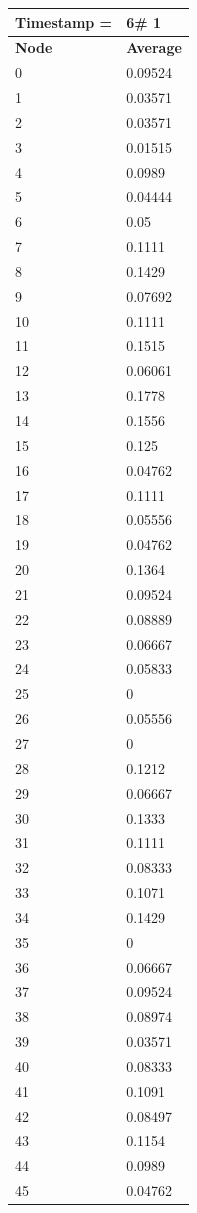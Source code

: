 \begin{tabular}{|l||l|}
\hline
\textbf{Timestamp =} & \textbf{6}\# 1\\\hline
	\textbf{Node} & \textbf{Average} \\ \hline
\hline
	0 & 0.09524 \\ \hline
	1 & 0.03571 \\ \hline
	2 & 0.03571 \\ \hline
	3 & 0.01515 \\ \hline
	4 & 0.0989 \\ \hline
	5 & 0.04444 \\ \hline
	6 & 0.05 \\ \hline
	7 & 0.1111 \\ \hline
	8 & 0.1429 \\ \hline
	9 & 0.07692 \\ \hline
	10 & 0.1111 \\ \hline
	11 & 0.1515 \\ \hline
	12 & 0.06061 \\ \hline
	13 & 0.1778 \\ \hline
	14 & 0.1556 \\ \hline
	15 & 0.125 \\ \hline
	16 & 0.04762 \\ \hline
	17 & 0.1111 \\ \hline
	18 & 0.05556 \\ \hline
	19 & 0.04762 \\ \hline
	20 & 0.1364 \\ \hline
	21 & 0.09524 \\ \hline
	22 & 0.08889 \\ \hline
	23 & 0.06667 \\ \hline
	24 & 0.05833 \\ \hline
	25 & 0 \\ \hline
	26 & 0.05556 \\ \hline
	27 & 0 \\ \hline
	28 & 0.1212 \\ \hline
	29 & 0.06667 \\ \hline
	30 & 0.1333 \\ \hline
	31 & 0.1111 \\ \hline
	32 & 0.08333 \\ \hline
	33 & 0.1071 \\ \hline
	34 & 0.1429 \\ \hline
	35 & 0 \\ \hline
	36 & 0.06667 \\ \hline
	37 & 0.09524 \\ \hline
	38 & 0.08974 \\ \hline
	39 & 0.03571 \\ \hline
	40 & 0.08333 \\ \hline
	41 & 0.1091 \\ \hline
	42 & 0.08497 \\ \hline
	43 & 0.1154 \\ \hline
	44 & 0.0989 \\ \hline
	45 & 0.04762 \\ \hline
\end{tabular}
